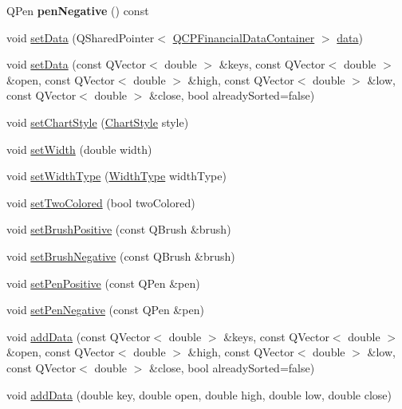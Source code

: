 \begin{DoxyCompactItemize}
Q\+Pen {\bfseries pen\+Negative} () const
\item 
void \hyperlink{class_q_c_p_financial_a72089e75b8a50d18097526c3c79fdb85}{set\+Data} (Q\+Shared\+Pointer$<$ \hyperlink{class_q_c_p_data_container}{Q\+C\+P\+Financial\+Data\+Container} $>$ \hyperlink{class_q_c_p_financial_aec3f666271cf48bd7b87d84fe3f8c074}{data})
\item 
void \hyperlink{class_q_c_p_financial_a12992e669ed19d7bb48dbe601570cc05}{set\+Data} (const Q\+Vector$<$ double $>$ \&keys, const Q\+Vector$<$ double $>$ \&open, const Q\+Vector$<$ double $>$ \&high, const Q\+Vector$<$ double $>$ \&low, const Q\+Vector$<$ double $>$ \&close, bool already\+Sorted=false)
\item 
void \hyperlink{class_q_c_p_financial_a5a59175d36279d71596e64d7bb65596f}{set\+Chart\+Style} (\hyperlink{class_q_c_p_financial_a0f800e21ee98d646dfc6f8f89d10ebfb}{Chart\+Style} style)
\item 
void \hyperlink{class_q_c_p_financial_a99633f8bac86a61d534ae5eeb1a3068f}{set\+Width} (double width)
\item 
void \hyperlink{class_q_c_p_financial_a204b7b710352796593a432b723e34089}{set\+Width\+Type} (\hyperlink{class_q_c_p_financial_aef1761dda71a53dc5269685e9e492626}{Width\+Type} width\+Type)
\item 
void \hyperlink{class_q_c_p_financial_a138e44aac160a17a9676652e240c5f08}{set\+Two\+Colored} (bool two\+Colored)
\item 
void \hyperlink{class_q_c_p_financial_a5ebff2b1764efd07cc44942e67821829}{set\+Brush\+Positive} (const Q\+Brush \&brush)
\item 
void \hyperlink{class_q_c_p_financial_a8bbdd87629f9144b3ef51af660c0961a}{set\+Brush\+Negative} (const Q\+Brush \&brush)
\item 
void \hyperlink{class_q_c_p_financial_ac58aa3adc7a35aab0088764b840683e5}{set\+Pen\+Positive} (const Q\+Pen \&pen)
\item 
void \hyperlink{class_q_c_p_financial_afe5c07e94ccea01a75b3a2476993c346}{set\+Pen\+Negative} (const Q\+Pen \&pen)
\item 
void \hyperlink{class_q_c_p_financial_a372ac031e44a7a6c912d203556af96f7}{add\+Data} (const Q\+Vector$<$ double $>$ \&keys, const Q\+Vector$<$ double $>$ \&open, const Q\+Vector$<$ double $>$ \&high, const Q\+Vector$<$ double $>$ \&low, const Q\+Vector$<$ double $>$ \&close, bool already\+Sorted=false)
\item 
void \hyperlink{class_q_c_p_financial_a688bbd052e00a02954ddb0068b378170}{add\+Data} (double key, double open, double high, double low, double close)

\end{DoxyCompactItemize}
